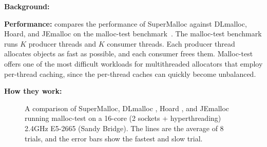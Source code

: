 \documentclass[pldi]{sigplanconf-pldi15}
\begin{document}
{\bf Background:}   

{\bf Performance:}  compares the performance of
SuperMalloc against DLmalloc, Hoard, and JEmalloc on the malloc-test
benchmark~\cite{LeverBo00}.  The malloc-test benchmark runs $K$
producer threads and $K$ consumer threads.  Each producer thread
allocates objects as fast as possible, and each consumer frees them.
Malloc-test offers one of the most difficult workloads for
multithreaded allocators that employ per-thread caching, since the
per-thread caches can quickly become unbalanced.


{\bf How they work:} 



\begin{figure}

\caption{A comparison of SuperMalloc, DLmalloc \cite{Lea96}, Hoard
  \cite{BergerMcBl00}, and JEmalloc~\cite{Evans06} running malloc-test
  on a 16-core (2 sockets + hyperthreading) 2.4GHz E5-2665 (Sandy
  Bridge).  The lines are the average of 8 trials, and the error bars
  show the fastest and slow trial.}
\label{fig:data}
\vspace*{-3ex}
\end{figure}




\end{document}
